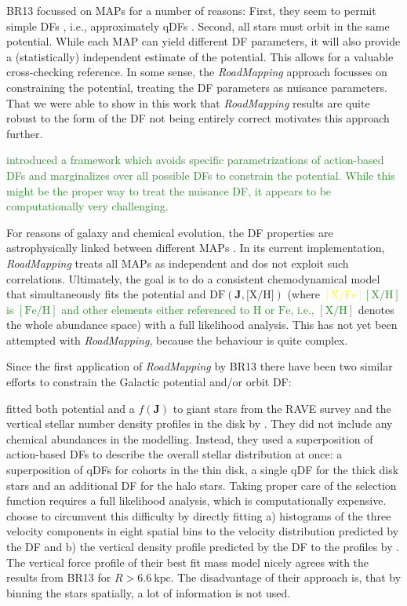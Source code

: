 \documentclass[iop,revtex4,numberedappendix,appendixfloats]{emulateapj}
\newcommand{\vect}[1]{\boldsymbol{#1}}
\newcommand{\MAP}{MAP}
\newcommand{\MAPs}{MAPs}
\newcommand{\RM}{{\sl RoadMapping}}
\newcommand{\NEW}[1]{\textcolor{ForestGreen}{#1}}
\newcommand{\OLD}[1]{\textcolor{Yellow}{#1}}%
\begin{document}
 BR13 focussed on \MAPs{} for a number of reasons: First, they seem to permit simple DFs \citep{2012ApJ...751..131B,2012ApJ...755..115B,2012ApJ...753..148B}, i.e., approximately qDFs \citep{2013MNRAS.434..652T}. Second, all stars must orbit in the same potential. While each \MAP{} can yield different DF parameters, it will also provide a (statistically) independent estimate of the potential. This allows for a valuable cross-checking reference. In some sense, the \RM{} approach focusses on constraining the potential, treating the DF parameters as nuisance parameters. That we were able to show in this work that \RM{} results are quite robust to the form of the DF not being entirely correct motivates this approach further. 

\NEW{\citet{2014MNRAS.437.2230M} introduced a framework which avoids specific parametrizations of action-based DFs and marginalizes over all possible DFs to constrain the potential. While this might be the proper way to treat the nuisance DF, it appears to be computationally very challenging.}

For reasons of galaxy and chemical evolution, the DF properties are astrophysically linked between different \MAPs{} \citep{2015MNRAS.449.3479S}. In its current implementation, \RM{} treats all \MAPs{} as independent and dos not exploit such correlations. Ultimately, the goal is to do a consistent chemodynamical model that simultaneously fits the potential and $\text{DF}(\vect{J},\text{[X/H]})$ (where \OLD{$[\mathrm{X}/\mathrm{Fe}]$}\NEW{$[\mathrm{X}/\mathrm{H}]$ is $[\mathrm{Fe}/\mathrm{H}]$ and other elements either referenced to $\mathrm{H}$ or $\mathrm{Fe}$, i.e., $[\mathrm{X}/\mathrm{H}]$} denotes the whole abundance space) with a full likelihood analysis. This has not yet been attempted with \RM{}, because the behaviour is quite complex. 

Since the first application of \RM{} by BR13 there have been two similar efforts to constrain the Galactic potential and/or orbit DF:

\citet{2014MNRAS.445.3133P} fitted both potential and a $f(\vect{J})$ to giant stars from the RAVE survey \citep{2006AJ....132.1645S} and the vertical stellar number density profiles in the disk by \citet{2008ApJ...673..864J}. They did not include any chemical abundances in the modelling. Instead, they used a superposition of action-based DFs to describe the overall stellar distribution at once: a superposition of qDFs for cohorts in the thin disk, a single qDF for the thick disk stars and an additional DF for the halo stars. Taking proper care of the selection function requires a full likelihood analysis, which is computationally expensive. \citet{2014MNRAS.445.3133P} choose to circumvent this difficulty by directly fitting a) histograms of the three velocity components in eight spatial bins to the velocity distribution predicted by the DF and b) the vertical density profile predicted by the DF to the profiles by \citet{2008ApJ...673..864J}. The vertical force profile of their best fit mass model nicely agrees with the results from BR13 for $R>6.6~\text{kpc}$. The disadvantage of their approach is, that by binning the stars spatially, a lot of information is not used.
\end{document}
